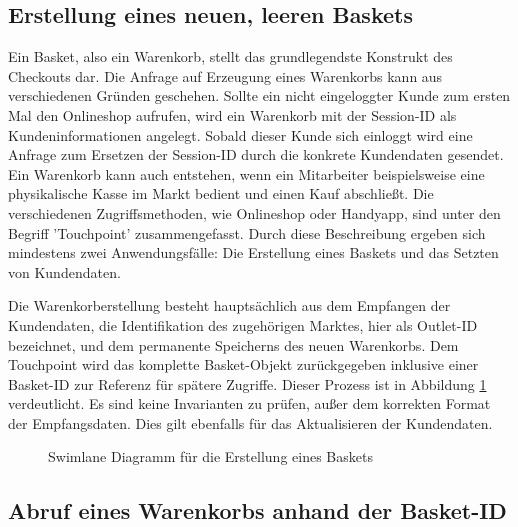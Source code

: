 \subsection{Erstellung eines neuen, leeren Baskets}

Ein Basket, also ein Warenkorb, stellt das grundlegendste Konstrukt des Checkouts dar. Die Anfrage auf Erzeugung eines Warenkorbs kann aus verschiedenen Gründen geschehen. Sollte ein nicht eingeloggter Kunde zum ersten Mal den Onlineshop aufrufen, wird ein Warenkorb mit der Session-ID als Kundeninformationen angelegt. Sobald dieser Kunde sich einloggt wird eine Anfrage zum Ersetzen der Session-ID durch die konkrete Kundendaten gesendet. Ein Warenkorb kann auch entstehen, wenn ein Mitarbeiter beispielsweise eine physikalische Kasse im Markt bedient und einen Kauf abschließt. Die verschiedenen Zugriffsmethoden, wie Onlineshop oder Handyapp, sind unter den Begriff 'Touchpoint' zusammengefasst. Durch diese Beschreibung ergeben sich mindestens zwei Anwendungsfälle: Die Erstellung eines Baskets und das Setzten von Kundendaten. 

Die Warenkorberstellung besteht hauptsächlich aus dem Empfangen der Kundendaten, die Identifikation des zugehörigen Marktes, hier als Outlet-ID bezeichnet, und dem permanente Speicherns des neuen Warenkorbs. Dem Touchpoint wird das komplette Basket-Objekt zurückgegeben inklusive einer Basket-ID zur Referenz für spätere Zugriffe. Dieser Prozess ist in Abbildung \ref{fig:SL-Basketcreation} verdeutlicht. Es sind keine Invarianten zu prüfen, außer dem korrekten Format der Empfangsdaten. Dies gilt ebenfalls für das Aktualisieren der Kundendaten.

\begin{figure}[htbp]
	\centering
	
	\caption{Swimlane Diagramm für die Erstellung eines Baskets}
	\label{fig:SL-Basketcreation}
\end{figure}

\subsection{Abruf eines Warenkorbs anhand der Basket-ID}

